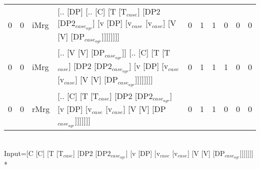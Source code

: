 \begin{tabularx}{\linewidth}{rrlXrrrrrr}
   0 &   0 & iMrg & [.. [DP] [.. [C] [T [T$_{case}$] [DP2 [DP2$_{case_{agr}}$] [v [DP] [v$_{case}$ [v$_{case}$] [V [V] [DP$_{case_{agr}}$]]]]]]]]                                                                               &            0 &             1 &             1 &                  0 &              0 &             0 \\
   0 &   0 & iMrg & [.. [V [V] [DP$_{case_{agr}}$]] [.. [C] [T [T$_{case}$] [DP2 [DP2$_{case_{agr}}$] [v [DP] [v$_{case}$ [v$_{case}$] [V [V] [DP$_{case_{agr}}$]]]]]]]]                                                              &            0 &             1 &             1 &                  1 &              0 &             0 \\
   0 &   0 & rMrg & [.. [C] [T [T$_{case}$] [DP2 [DP2$_{case_{agr}}$] [v [DP] [v$_{case}$ [v$_{case}$] [V [V] [DP$_{case_{agr}}$]]]]]]]                                                                                         &            0 &             1 &             1 &                  0 &              0 &             0 \\
\hline
\end{tabularx}\endgroup\\
\begingroup\scriptsize Input=[C [C] [T [T$_{case}$] [DP2 [DP2$_{case_{agr}}$] [v [DP] [v$_{case}$ [v$_{case}$] [V [V] [DP$_{case_{agr}}$]]]]]]]\\*
